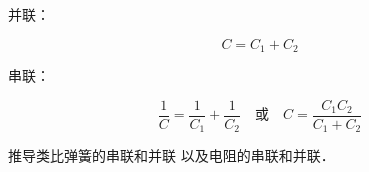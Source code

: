 

并联：

\begin{equation}
C = C_1 + C_2
\end{equation}

串联：

\begin{equation}
\frac{1}{C} = \frac{1}{C_1} + \frac{1}{C_2}
\quad \text{或} \quad
C = \frac{C_1C_2}{C_1 + C_2}
\end{equation}

推导类比弹簧的串联和并联 以及电阻的串联和并联．
